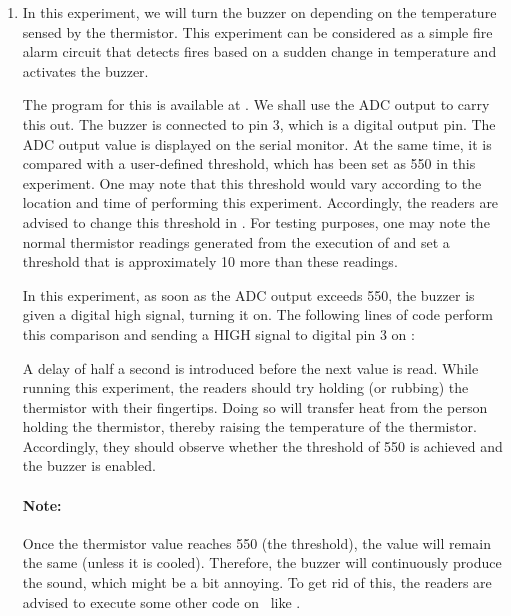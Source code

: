 \begin{enumerate}
  \item In this experiment, we will turn the buzzer on depending
        on the temperature sensed by the thermistor. This experiment
        can be considered as a simple fire alarm circuit that
        detects fires based on a sudden change in temperature and
        activates the buzzer.

        The program for this is
        available at . We shall use the ADC output
        to carry this out. The buzzer is connected to pin 3, which is a
        digital output pin. The ADC output value is displayed on the serial
        monitor. At the same time, it is compared with a user-defined
        threshold, which has been set as 550 in this experiment. One may note that
        this threshold would vary according to the location and time of performing
        this experiment. Accordingly, the readers are advised to change this threshold
        in . For testing purposes, one may note the
        normal thermistor readings generated from the execution of 
        and set a threshold that is approximately 10 more than these readings.

        In this experiment, as soon as the ADC output exceeds 550, the buzzer is given a digital
        high signal, turning it on. The following lines of code perform this
        comparison and sending a {HIGH} signal to digital pin 3 on \arduino:
        
        A delay of half a second is introduced
        before the next value is read. While running this experiment,
        the readers should try holding (or rubbing) the thermistor with their fingertips.
        Doing so will transfer heat from the person holding the
        thermistor, thereby raising the temperature of the thermistor.
        Accordingly, they should observe whether the threshold of 550 is achieved
        and the buzzer is enabled.

        \paragraph{Note:} Once the thermistor value reaches 550 (the threshold), the value will remain the same
        (unless it is cooled). Therefore, the buzzer will continuously produce the sound, which might be
        a bit annoying. To get rid of this, the readers are advised to
        execute some other code on \arduino\ like .

\end{enumerate}


